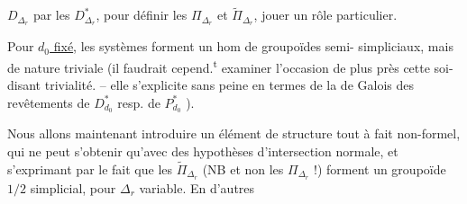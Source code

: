 $D_{\Delta_r}$ par les $D^*_{\Delta_r}$, pour définir les
$\Pi_{\Delta_r}$ et $\widetilde\Pi_{\Delta_r}$, 
jouer un rôle particulier.

Pour \uline{$d_0$ fixé}, les systèmes
forment un hom de groupoïdes semi-
simpliciaux, mais de nature 
triviale (il faudrait cepend.\textsuperscript{t} examiner
 l'occasion de plus près cette soi-disant
trivialité. --  elle s'explicite sans peine
en termes de la  de Galois
des revêtements de $D^*_{d_0}$ resp. de $P^*_{d_0}$ \unsure{\ldots|--}).

Nous allons maintenant introduire
un élément de structure tout à fait
non-formel, qui ne peut s'obtenir
qu'avec des hypothèses 
d'intersection normale, et s'exprimant
par le fait que les $\widetilde\Pi_{\Delta_r}$ (NB et
non les $\Pi_{\Delta_r}$ !) forment un groupoïde
$1/2$ simplicial, pour $\Delta_r$ variable. En d'autres
